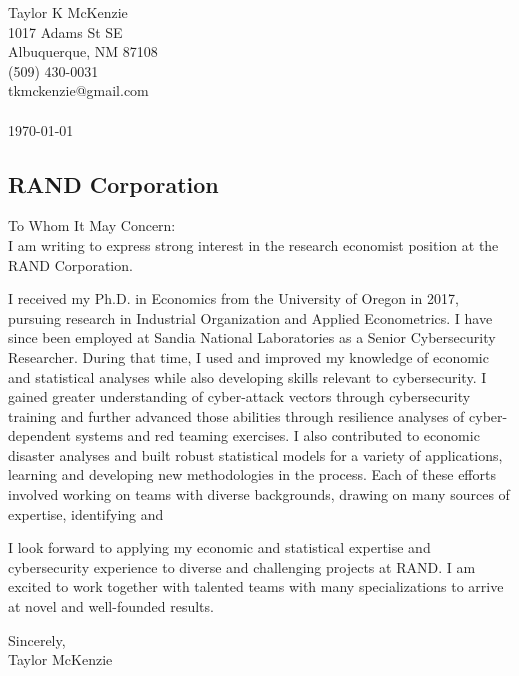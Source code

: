 \documentclass[]{article}
\begin{document}
\thispagestyle{empty}

\noindent Taylor K McKenzie\\1017 Adams St SE\\ Albuquerque, NM 87108\\ (509) 430-0031\\ tkmckenzie@gmail.com\\ \\
\today

\subsection*{RAND Corporation}

To Whom It May Concern: \\

I am writing to express strong interest in the research economist position at the RAND Corporation.

I received my Ph.D. in Economics from the University of Oregon in 2017, pursuing research in Industrial Organization and Applied Econometrics. I have since been employed at Sandia National Laboratories as a Senior Cybersecurity Researcher. During that time, I used and improved my knowledge of economic and statistical analyses while also developing skills relevant to cybersecurity. I gained greater understanding of cyber-attack vectors through cybersecurity training and further advanced those abilities through resilience analyses of cyber-dependent systems and red teaming exercises. I also contributed to economic disaster analyses and built robust statistical models for a variety of applications, learning and developing new methodologies in the process. Each of these efforts involved working on teams with diverse backgrounds, drawing on many sources of expertise, identifying and 

I look forward to applying my economic and statistical expertise and cybersecurity experience to diverse and challenging projects at RAND. I am excited to work together with talented teams with many specializations to arrive at novel and well-founded results.

\noindent Sincerely,\\

\noindent Taylor McKenzie
\end{document}
